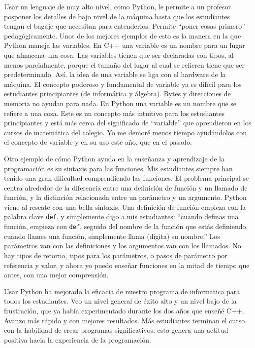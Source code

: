 Usar un lenguaje de muy alto nivel, como Python, le permite a un profesor posponer
los detalles de bajo nivel de la máquina hasta que los estudiantes tengan
el bagaje que necesitan para entenderlos. Permite  ``poner cosas primero'' 
pedagógicamente.  Unos de los mejores ejemplos de esto es la manera en la que Python maneja las variables.  
En C++ una variable es un nombre para un lugar que almacena
una cosa.  Las variables tienen que ser declaradas  con tipos, al menos parcialmente, 
porque el tamaño del lugar al cual se refieren tiene que ser predeterminado.  Así, 
la idea de una variable se liga con el hardware de la máquina.  El concepto poderoso y 
fundamental de  variable ya es difícil para los estudiantes principiantes (de informática y
 álgebra).  Bytes y direcciones de memoria no ayudan para nada.  En Python una variable 
es un nombre que  se refiere a una cosa.  Este es un concepto más intuitivo para los estudiantes 
principiantes y está más cerca del significado de ``variable'' que aprendieron en los cursos 
de matemática del colegio. Yo me demoré menos tiempo ayudándolos con el
concepto de variable y en su uso este año, que en el pasado.

Otro ejemplo de cómo Python ayuda en la enseñanza y aprendizaje de la programación es su sintaxis 
para las funciones.  Mis estudiantes siempre han tenido una gran 
dificultad comprendiendo las funciones.  El problema principal se centra alrededor 
de la diferencia entre una definición de función y un llamado de  función, y la 
distinción relacionada entre un parámetro y un argumento.  Python viene al 
rescate con una bella sintaxis.  Una definición de función empieza con la palabra clave \texttt{def}, 
y simplemente digo a mis estudiantes: ``cuando
definas una función, empieza con \texttt{def}, seguido del nombre de la función que estás definiendo,  
cuando llames una función, simplemente llama (digita) su
nombre.''  Los parámetros van con las definiciones y los argumentos van con los llamados.  
No hay tipos de retorno, tipos para los parámetros, o pasos de parámetro por referencia y valor, 
y ahora yo puedo enseñar funciones en la mitad de tiempo que antes, con una mejor comprensión. 

Usar Python ha mejorado la eficacia de nuestro programa de informática para 
todos los estudiantes.  Veo un nivel general de éxito alto y un nivel bajo de
la frustración, que ya había experimentado durante los dos años que enseñé C++.  Avanzo más 
rápido y con mejores resultados.  Más estudiantes terminan el curso con la habilidad
de  crear programas significativos; esto genera  una actitud positiva hacia la experiencia de la programación.

